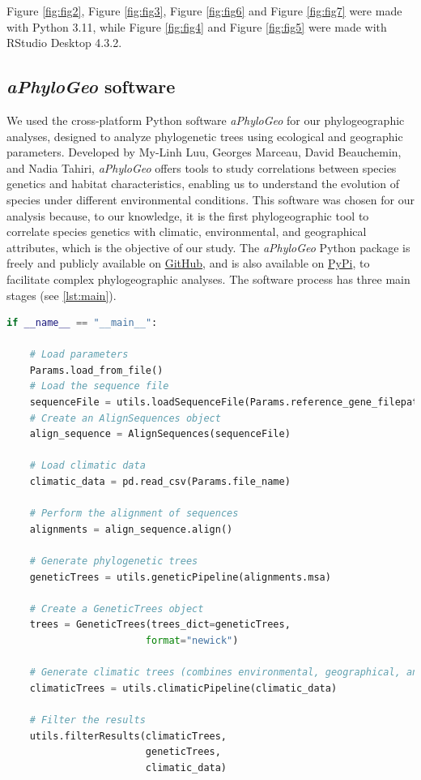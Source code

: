 Figure \ref{fig:fig2}, Figure \ref{fig:fig3}, Figure \ref{fig:fig6} and Figure \ref{fig:fig7} were made with Python 3.11, while Figure \ref{fig:fig4} and Figure \ref{fig:fig5} were made with RStudio Desktop 4.3.2.

\subsection{{\textit{aPhyloGeo} software}\label{aPhyloGeo-software}}
We used the cross-platform Python software \textit{aPhyloGeo} for our phylogeographic analyses, designed to analyze phylogenetic trees using ecological and geographic parameters. Developed by My-Linh Luu, Georges Marceau, David Beauchemin, and Nadia Tahiri, \textit{aPhyloGeo} offers tools to study correlations between species genetics and habitat characteristics, enabling us to understand the evolution of species under different environmental conditions. This software was chosen for our analysis because, to our knowledge, it is the first phylogeographic tool to correlate species genetics with climatic, environmental, and geographical attributes, which is the objective of our study. The \textit{aPhyloGeo} Python package is freely and publicly available on \href{https://github.com/tahiri-lab/aPhyloGeo}{GitHub}, and is also available on \href{https://pypi.org/project/aphylogeo/}{PyPi}, to facilitate complex phylogeographic analyses. The software process has three main stages (see \autoref{lst:main}).

\begin{lstlisting}[label=lst:main,language=Python,caption=Main script for tutorial using the aPhyloGeo package.]
if __name__ == "__main__":

    # Load parameters
    Params.load_from_file()
    # Load the sequence file
    sequenceFile = utils.loadSequenceFile(Params.reference_gene_filepath)
    # Create an AlignSequences object
    align_sequence = AlignSequences(sequenceFile)

    # Load climatic data 
    climatic_data = pd.read_csv(Params.file_name)

    # Perform the alignment of sequences
    alignments = align_sequence.align()

    # Generate phylogenetic trees
    geneticTrees = utils.geneticPipeline(alignments.msa)
    
    # Create a GeneticTrees object
    trees = GeneticTrees(trees_dict=geneticTrees, 
                        format="newick")
   
    # Generate climatic trees (combines environmental, geographical, and climatic data)
    climaticTrees = utils.climaticPipeline(climatic_data)
    
    # Filter the results
    utils.filterResults(climaticTrees, 
                        geneticTrees, 
                        climatic_data)

\end{lstlisting}

